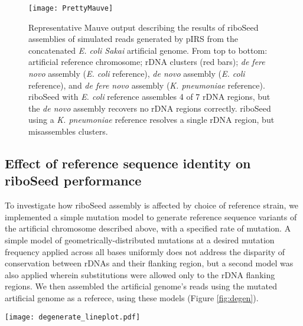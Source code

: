 \documentclass[a4,center,fleqn]{NAR}
\begin{document}
\begin{figure}[!h]
    \centering
    \hspace*{-1cm}\texttt{[image: PrettyMauve]}
    \caption{Representative Mauve output describing the results of riboSeed assemblies of simulated reads generated by pIRS from the concatenated \textit{E. coli Sakai} artificial genome. From top to bottom: artificial reference chromosome; rDNA clusters (red bars); \textit{de fere novo} assembly (\textit{E. coli} reference), \textit{de novo} assembly (\textit{E. coli} reference), and \textit{de fere novo} assembly (\textit{K. pneumoniae} reference). riboSeed with \textit{E. coli} reference assembles 4 of 7 rDNA regions, but the \textit{de novo} assembly recovers no rDNA regions correctly. riboSeed using a \textit{K. pneumoniae} reference resolves a single rDNA region, but misassembles clusters.
}
    \label{fig:artificial}
\end{figure}

\subsection*{Effect of reference sequence identity on riboSeed performance}
To investigate how riboSeed assembly is affected by choice of reference strain, we implemented a simple mutation model to generate reference sequence variants of the artificial chromosome described above, with a specified rate of mutation.  A simple model of geometrically-distributed mutations at a desired mutation frequency applied across all bases uniformly does not address the disparity of conservation between rDNAs and their flanking region, but a second model was also applied wherein substitutions were allowed only to the rDNA flanking regions. We then assembled the artificial genome's reads using the mutated artificial genome as a referece, using these models (Figure \ref{fig:degen}).

\begin{figure*}[t]
  \centering
    \texttt{[image: degenerate\_lineplot.pdf]}
  \caption{Variants of the artificial genome with substitutions frequencies between 0 and 0.3 (i.e. 300 substitutions per kbp). Correctly-assembled rDNAs were counted, and the distribution of results shown against the appropriate substitution frequency. Results are shown for models where substitutions are permitted throughout the chromosome (orange), and only in the flanking regions (blue), the latter approximating the relative rate of substitution in rDNA and flanking regions. Grey area corresponds to substitution frequencies resulting in average sequence identity over 95\%.  Outliers are shown as $+$'s. N=100.}
  \label{fig:degen}
\end{figure*}
\end{document}
